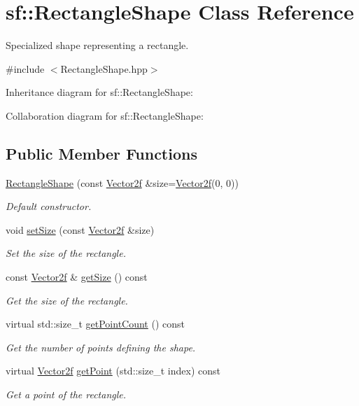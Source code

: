 \hypertarget{classsf_1_1_rectangle_shape}{}\section{sf\+:\+:Rectangle\+Shape Class Reference}
\label{classsf_1_1_rectangle_shape}


Specialized shape representing a rectangle.  




{\ttfamily \#include $<$Rectangle\+Shape.\+hpp$>$}



Inheritance diagram for sf\+:\+:Rectangle\+Shape\+:


Collaboration diagram for sf\+:\+:Rectangle\+Shape\+:
\subsection*{Public Member Functions}
\begin{DoxyCompactItemize}
\item 
\hyperlink{classsf_1_1_rectangle_shape_a83a2be157ebee85c95ed491c3e78dd7c}{Rectangle\+Shape} (const \hyperlink{classsf_1_1_vector2}{Vector2f} \&size=\hyperlink{classsf_1_1_vector2}{Vector2f}(0, 0))
\begin{DoxyCompactList}\small\item\em Default constructor. \end{DoxyCompactList}\item 
void \hyperlink{classsf_1_1_rectangle_shape_a5c65d374d4a259dfdc24efdd24a5dbec}{set\+Size} (const \hyperlink{classsf_1_1_vector2}{Vector2f} \&size)
\begin{DoxyCompactList}\small\item\em Set the size of the rectangle. \end{DoxyCompactList}\item 
const \hyperlink{classsf_1_1_vector2}{Vector2f} \& \hyperlink{classsf_1_1_rectangle_shape_ae54a07ff5537bf76de6748f592b34896}{get\+Size} () const
\begin{DoxyCompactList}\small\item\em Get the size of the rectangle. \end{DoxyCompactList}\item 
virtual std\+::size\+\_\+t \hyperlink{classsf_1_1_rectangle_shape_adfb2f429e5720c9ccdb26d5996c3ae33}{get\+Point\+Count} () const
\begin{DoxyCompactList}\small\item\em Get the number of points defining the shape. \end{DoxyCompactList}\item 
virtual \hyperlink{classsf_1_1_vector2}{Vector2f} \hyperlink{classsf_1_1_rectangle_shape_a3909f1a1946930ff5ae17c26206c0f81}{get\+Point} (std\+::size\+\_\+t index) const
\begin{DoxyCompactList}\small\item\em Get a point of the rectangle. \end{DoxyCompactList}\end{DoxyCompactItemize}

